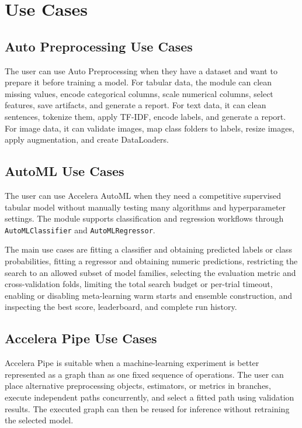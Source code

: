 \documentclass[12pt,a4paper]{report}
\begin{document}
\chapter{Use Cases}
\section{Auto Preprocessing Use Cases}
The user can use Auto Preprocessing when they have a dataset and want to
prepare it before training a model. For tabular data, the module can clean
missing values, encode categorical columns, scale numerical columns, select
features, save artifacts, and generate a report. For text data, it can clean
sentences, tokenize them, apply TF-IDF, encode labels, and generate a report.
For image data, it can validate images, map class folders to labels, resize
images, apply augmentation, and create DataLoaders.

\section{AutoML Use Cases}
The user can use Accelera AutoML when they need a competitive supervised
tabular model without manually testing many algorithms and hyperparameter
settings. The module supports classification and regression workflows through
\texttt{AutoMLClassifier} and \texttt{AutoMLRegressor}.

\noindent The main use cases are fitting a classifier and obtaining predicted
labels or class probabilities, fitting a regressor and obtaining numeric
predictions, restricting the search to an allowed subset of model families,
selecting the evaluation metric and cross-validation folds, limiting the total
search budget or per-trial timeout, enabling or disabling meta-learning warm
starts and ensemble construction, and inspecting the best score, leaderboard,
and complete run history.
\section{Accelera Pipe Use Cases}
Accelera Pipe is suitable when a machine-learning experiment is better
represented as a graph than as one fixed sequence of operations. The user can
place alternative preprocessing objects, estimators, or metrics in branches,
execute independent paths concurrently, and select a fitted path using
validation results. The executed graph can then be reused for inference without
retraining the selected model.
\end{document}
